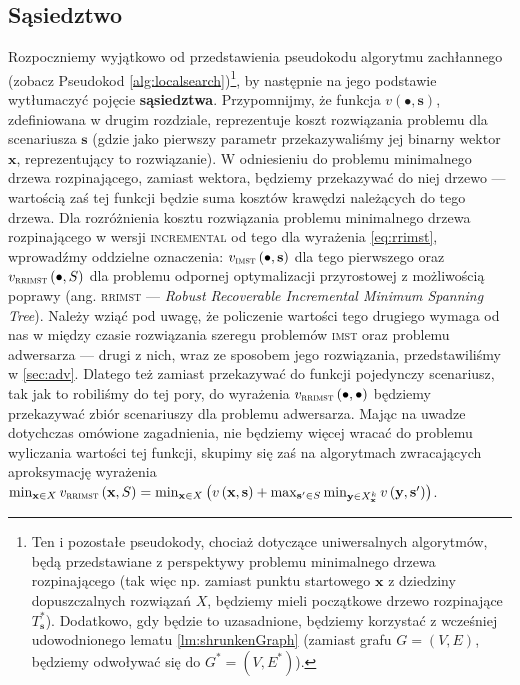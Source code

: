 \subsection{Sąsiedztwo}

Rozpoczniemy wyjątkowo od przedstawienia pseudokodu algorytmu zachłannego (zobacz Pseudokod \ref{alg:localsearch})\footnote{Ten i pozostałe pseudokody, chociaż dotyczące uniwersalnych algorytmów, będą przedstawiane z perspektywy problemu minimalnego drzewa rozpinającego (tak więc np. zamiast punktu startowego $\textbf{x}$ z dziedziny dopuszczalnych rozwiązań $X$, będziemy mieli początkowe drzewo rozpinające $T^{\ast}_{\textbf{s}}$). Dodatkowo, gdy będzie to uzasadnione, będziemy korzystać z wcześniej udowodnionego lematu \ref{lm:shrunkenGraph} (zamiast grafu $G = \left( V, E \right)$, będziemy odwoływać się do $G^{\ast} = \left( V, E^{\ast} \right)$).}, by następnie na jego podstawie wytłumaczyć pojęcie \textbf{sąsiedztwa}. Przypomnijmy, że funkcja $v \left( \bullet, \textbf{s} \right)$, zdefiniowana w drugim rozdziale, reprezentuje koszt rozwiązania problemu dla scenariusza $\textbf{s}$ (gdzie jako pierwszy parametr przekazywaliśmy jej binarny wektor $\textbf{x}$, reprezentujący to rozwiązanie). W odniesieniu do problemu minimalnego drzewa rozpinającego, zamiast wektora, będziemy przekazywać do niej drzewo --- wartością zaś tej funkcji będzie suma kosztów krawędzi należących do tego drzewa. Dla rozróżnienia kosztu rozwiązania problemu minimalnego drzewa rozpinającego w wersji \textsc{incremental} od tego dla wyrażenia \ref{eq:rrimst}, wprowadźmy oddzielne oznaczenia: $v_{\textsc{imst}} \left( \bullet, \textbf{s} \right)$ dla tego pierwszego oraz $v_{\textsc{rrimst}} \left( \bullet, S \right)$ dla problemu odpornej optymalizacji przyrostowej z możliwością poprawy (ang. \textsc{rrimst} --- \textit{Robust Recoverable Incremental Minimum Spanning Tree}). Należy wziąć pod uwagę, że policzenie wartości tego drugiego wymaga od nas w między czasie rozwiązania szeregu problemów \textsc{imst} oraz problemu adwersarza --- drugi z nich, wraz ze sposobem jego rozwiązania, przedstawiliśmy w \ref{sec:adv}. Dlatego też zamiast przekazywać do funkcji pojedynczy scenariusz, tak jak to robiliśmy do tej pory, do wyrażenia $v_{\textsc{rrimst}} \left( \bullet, \bullet \right)$ będziemy przekazywać zbiór scenariuszy dla problemu adwersarza. Mając na uwadze dotychczas omówione zagadnienia, nie będziemy więcej wracać do problemu wyliczania wartości tej funkcji, skupimy się zaś na algorytmach zwracających aproksymację wyrażenia $\min_{\textbf{x} \in X} v_{\textsc{rrimst}} \left( \textbf{x}, S \right) = \min_{\textbf{x} \in X} \left( v \left( \textbf{x}, \textbf{s} \right) + \max_{\textbf{s}^{\prime} \in S} \min_{\textbf{y} \in X^{k}_{\textbf{x}}} v \left( \textbf{y}, \textbf{s}^{\prime} \right) \right)$.
\vspace*{-8pt}

